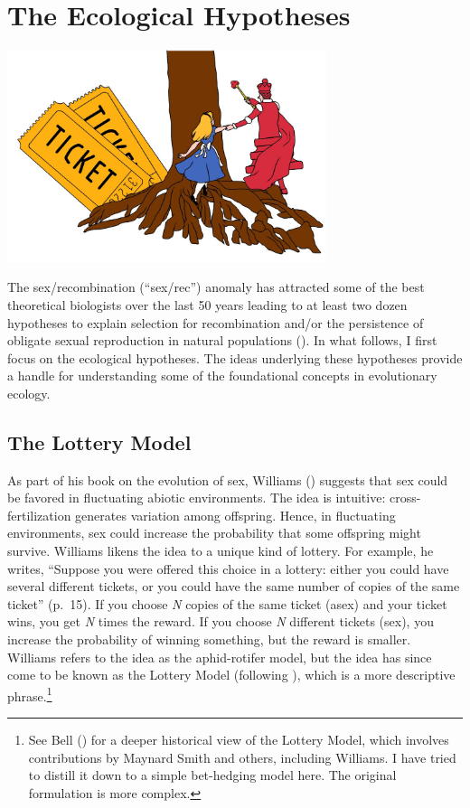 \documentclass[
  letterpaper,
]{book}
\begin{document}

\chapter{The Ecological Hypotheses}\label{sec-eco-hyp}

\begin{center}
\includegraphics[width=0.7\textwidth,height=\textheight]{images/fig2-1.jpeg}
\end{center}

The sex/recombination (``sex/rec'') anomaly has attracted some of the
best theoretical biologists over the last 50 years leading to at least
two dozen hypotheses to explain selection for recombination and/or the
persistence of obligate sexual reproduction in natural populations
(). In what follows, I
first focus on the ecological hypotheses. The ideas underlying these
hypotheses provide a handle for understanding some of the foundational
concepts in evolutionary ecology.

\section{The Lottery Model}\label{the-lottery-model}

As part of his book on the evolution of sex, Williams
() suggests that sex could be favored
in fluctuating abiotic environments. The idea is intuitive:
cross-fertilization generates variation among offspring. Hence, in
fluctuating environments, sex could increase the probability that some
offspring might survive. Williams likens the idea to a unique kind of
lottery. For example, he writes, ``Suppose you were offered this choice
in a lottery: either you could have several different tickets, or you
could have the same number of copies of the same ticket'' (p.~15). If
you choose \emph{N} copies of the same ticket (asex) and your ticket
wins, you get \emph{N} times the reward. If you choose \emph{N}
different tickets (sex), you increase the probability of winning
something, but the reward is smaller. Williams refers to the idea as the
aphid-rotifer model, but the idea has since come to be known as the
Lottery Model (following ), which is
a more descriptive phrase.\footnote{See Bell
  () for a deeper historical view of the
  Lottery Model, which involves contributions by Maynard Smith and
  others, including Williams. I have tried to distill it down to a
  simple bet-hedging model here. The original formulation is more
  complex.}
\end{document}
